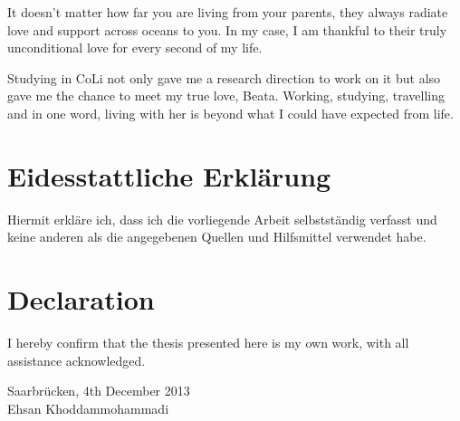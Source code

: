 It doesn't matter how far you are living from your parents, they always radiate
love and support across oceans to you. In my case, I am thankful to their truly
unconditional love for every second of my life. 

Studying in CoLi not only gave me a research direction to work on it but also
gave me the chance to meet my true love, Beata. Working, studying, travelling
and in one word, living with her is beyond what I could have expected from life.




\newpage

\section*{Eidesstattliche Erkl\"{a}rung}
Hiermit erkl\"{a}re ich, dass ich die vorliegende Arbeit selbstst\"{a}ndig
verfasst und keine anderen als die angegebenen Quellen und Hilfsmittel
verwendet habe.

\vspace{2cm}
\section*{Declaration}
I hereby confirm that the thesis presented here is my own work, with all
assistance acknowledged.


\vspace{4cm}
Saarbr\"{u}cken, 4th December 2013\\
Ehsan Khoddammohammadi 

